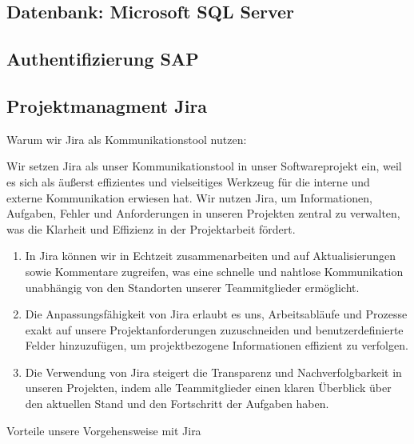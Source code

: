 \documentclass{article}
\begin{document}
    \subsection{Datenbank: Microsoft SQL Server}
    \subsection{Authentifizierung SAP}
    \subsection{Projektmanagment Jira}
    Warum wir Jira als Kommunikationstool nutzen:
    
    Wir setzen Jira als unser Kommunikationstool in unser Softwareprojekt ein, weil es sich als äußerst effizientes und vielseitiges Werkzeug für die interne und externe Kommunikation erwiesen hat. Wir nutzen Jira, um Informationen, Aufgaben, Fehler und Anforderungen in unseren Projekten zentral zu verwalten, was die Klarheit und Effizienz in der Projektarbeit fördert.
    \begin{enumerate}
        \item In Jira können wir in Echtzeit zusammenarbeiten und auf Aktualisierungen sowie Kommentare zugreifen, was eine schnelle und nahtlose Kommunikation unabhängig von den Standorten unserer Teammitglieder ermöglicht.
        \item Die Anpassungsfähigkeit von Jira erlaubt es uns, Arbeitsabläufe und Prozesse exakt auf unsere Projektanforderungen zuzuschneiden und benutzerdefinierte Felder hinzuzufügen, um projektbezogene Informationen effizient zu verfolgen.
        \item Die Verwendung von Jira steigert die Transparenz und Nachverfolgbarkeit in unseren Projekten, indem alle Teammitglieder einen klaren Überblick über den aktuellen Stand und den Fortschritt der Aufgaben haben.

    \end{enumerate}
    Vorteile unsere Vorgehensweise mit Jira
\end{document}
